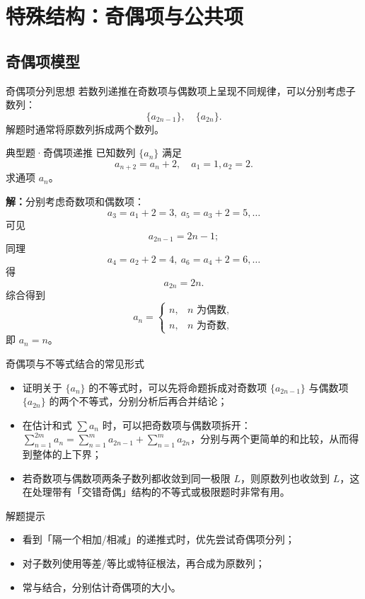 \documentclass[a4paper,11pt]{ctexart}
\begin{document}
\clearpage
\section{特殊结构：奇偶项与公共项}

\subsection{奇偶项模型}

\begin{definitionbox}{奇偶项分列思想}
  若数列递推在奇数项与偶数项上呈现不同规律，可以分别考虑子数列：
  \[
    \{a_{2n-1}\},\quad\{a_{2n}\}.
  \]
  解题时通常将原数列拆成两个数列。
\end{definitionbox}

\begin{examplebox}{典型题·奇偶项递推}
  已知数列 $\{a_n\}$ 满足
  \[
    a_{n+2}=a_n+2,\quad a_1=1,a_2=2.
  \]
  求通项 $a_n$。

  \textbf{解：}分别考虑奇数项和偶数项：
  \[
    a_3=a_1+2=3,\ a_5=a_3+2=5,\dots
  \]
  可见
  \[
    a_{2n-1}=2n-1;
  \]
  同理
  \[
    a_4=a_2+2=4,\ a_6=a_4+2=6,\dots
  \]
  得
  \[
    a_{2n}=2n.
  \]
  综合得到
  \[
    a_n=
    \begin{cases}
      n, & n\text{ 为偶数},\\
      n, & n\text{ 为奇数},
    \end{cases}
  \]
  即 $a_n=n$。
\end{examplebox}

\begin{sideinfobox}{奇偶项与不等式结合的常见形式}
  \begin{itemize}
    \item 证明关于 $\{a_n\}$ 的不等式时，可以先将命题拆成对奇数项 $\{a_{2n-1}\}$ 与偶数项 $\{a_{2n}\}$ 的两个不等式，分别分析后再合并结论；
    \item 在估计和式 $\sum a_n$ 时，可以把奇数项与偶数项拆开：$\sum_{n=1}^{2m}a_n=\sum_{n=1}^{m}a_{2n-1}+\sum_{n=1}^{m}a_{2n}$，分别与两个更简单的和比较，从而得到整体的上下界；
    \item 若奇数项与偶数项两条子数列都收敛到同一极限 $L$，则原数列也收敛到 $L$，这在处理带有「交错奇偶」结构的不等式或极限题时非常有用。
  \end{itemize}
\end{sideinfobox}

\begin{notebox}{解题提示}
  \begin{itemize}
    \item 看到「隔一个相加/相减」的递推式时，优先尝试奇偶项分列；
    \item 对子数列使用等差/等比或特征根法，再合成为原数列；
    \item 常与结合，分别估计奇偶项的大小。
  \end{itemize}
\end{notebox}
\end{document}
